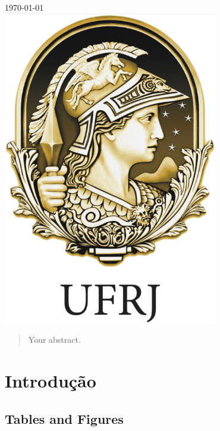 \documentclass[12pt]{article}
\begin{document}
\begin{titlepage}
{\large \today}\\[2cm] %


\includegraphics{logos/ufrj-logo.png}\\[1cm]
 

\vfill %

\end{titlepage}


\begin{abstract}
Your abstract.
\end{abstract}

\section{Introdução}



\subsection{Tables and Figures}
\end{document}
